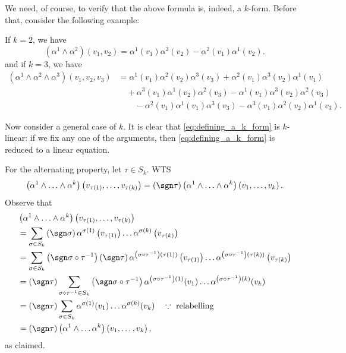 \documentclass[notoc,notitlepage]{tufte-book}
\begin{document}
We need, of course, to verify that the above formula is, indeed, a $k$-form.
Before that, consider the following example:

\begin{eg}
  If $k = 2$, we have
  \begin{equation*}
    \left( \alpha^1 \land \alpha^2 \right)(v_1, v_2)
      = \alpha^1(v_1) \alpha^2(v_2) - \alpha^2(v_1) \alpha^1(v_2).
  \end{equation*}
  and if $k = 3$, we have
  \begin{align*}
    \left( \alpha^1 \land \alpha^2 \land \alpha^3 \right)( v_1, v_2, v_3 )
      &= \alpha^1(v_1) \alpha^2(v_2) \alpha^3(v_3) + \alpha^2(v_1) \alpha^3(v_2) \alpha^1(v_1) \\
      &\quad + \alpha^3(v_1) \alpha^1(v_2) \alpha^2(v_3) - \alpha^1(v_1) \alpha^3(v_2) \alpha^2(v_3) \\
      &\qquad - \alpha^2(v_1) \alpha^1(v_1) \alpha^3(v_3) - \alpha^3(v_1) \alpha^2(v_2) \alpha^1(v_3).
  \end{align*}
\end{eg}

Now consider a general case of $k$. It is clear that \cref{eq:defining_a_k_form} is
$k$-linear: if we fix any one of the arguments, then \cref{eq:defining_a_k_form} is
reduced to a linear equation.

For the alternating property, let $\tau \in S_k$. WTS
\begin{equation*}
  \left( \alpha^1 \land \hdots \land \alpha^k \right) \left( v_{\tau(1)}, \ldots, v_{\tau(k)} \right)
    = ( \sgn \tau )\left( \alpha^1 \land \hdots \land \alpha^k \right) \left( v_1, \ldots, v_k \right).
\end{equation*}
Observe that
\begin{align*}
  &\left( \alpha^1 \land \hdots \land \alpha^k \right) \left( v_{\tau(1)}, \ldots, v_{\tau(k)} \right) \\
  &= \sum_{\sigma \in S_k} \left( \sgn \sigma \right)
    \alpha^{\sigma(1)} \left(v_{\tau(1)}\right) \hdots \alpha^{\sigma(k)} \left( v_{\tau(k)} \right) \\
  &= \sum_{\sigma \in S_k} \left( \sgn \sigma \circ \tau^{-1} \right) \left( \sgn \tau \right)
    \alpha^{\left(\sigma \circ \tau^{-1}\right)(\tau(1))} \left(v_{\tau(1)}\right) \hdots
    \alpha^{\left( \sigma \circ \tau^{-1} \right)(\tau(k))} \left( v_{\tau(k)} \right) \\
  &= \left( \sgn \tau \right) \sum_{\sigma \circ \tau^{-1} \in S_k} \left( \sgn \sigma \circ \tau^{-1} \right)
    \alpha^{\left( \sigma \circ \tau^{-1} \right)(1)} (v_1) \hdots
    \alpha^{\left( \sigma \circ \tau^{-1} \right)(k)} (v_k) \\
  &= \left( \sgn \tau \right) \sum_{\sigma \in S_k} \alpha^{\sigma(1)} (v_1) \hdots \alpha^{\sigma(k)} (v_k) \quad \because \text{ relabelling } \\
  &= \left( \sgn \tau \right) \left( \alpha^1 \land \hdots \alpha^k \right) \left( v_1, \ldots, v_k \right),
\end{align*}
as claimed.
\end{document}

